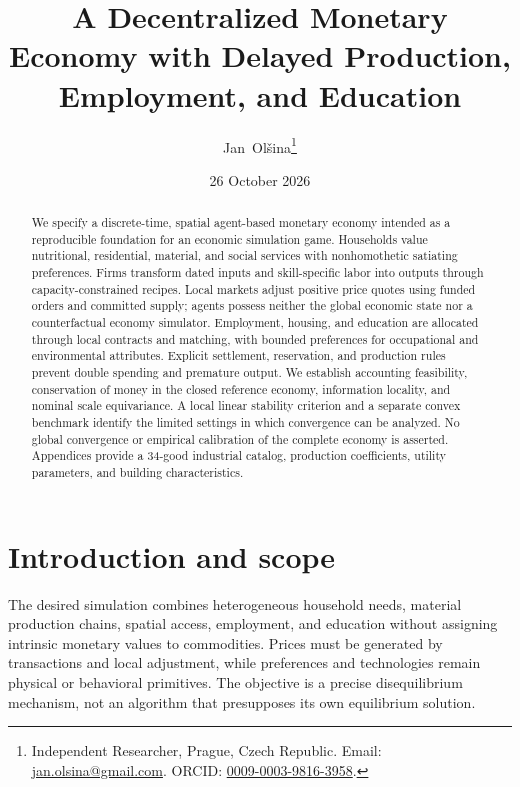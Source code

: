 \documentclass[10pt,a4paper,twocolumn]{article}
\begin{document}
\title{A Decentralized Monetary Economy with Delayed Production, Employment, and Education}
\author{Jan~Ol\v{s}ina\thanks{Independent Researcher, Prague, Czech Republic.
Email: \href{mailto:jan.olsina@gmail.com}{jan.olsina@gmail.com}.
ORCID: \href{https://orcid.org/0009-0003-9816-3958}{0009-0003-9816-3958}.}}
\date{26 October 2026}
\maketitle

\begin{abstract}
We specify a discrete-time, spatial agent-based monetary economy intended
as a reproducible foundation for an economic simulation game. Households
value nutritional, residential, material, and social services with
nonhomothetic satiating preferences. Firms transform dated inputs and
skill-specific labor into outputs through capacity-constrained recipes.
Local markets adjust positive price quotes using funded orders and
committed supply; agents possess neither the global economic state nor a
counterfactual economy simulator. Employment, housing, and education are
allocated through local contracts and matching, with bounded preferences
for occupational and environmental attributes. Explicit settlement,
reservation, and production rules prevent double spending and premature
output. We establish accounting feasibility, conservation of money in the
closed reference economy, information locality, and nominal scale
equivariance. A local linear stability criterion and a separate convex
benchmark identify the limited settings in which convergence can be
analyzed. No global convergence or empirical calibration of the complete
economy is asserted. Appendices provide a 34-good industrial catalog,
production coefficients, utility parameters, and building characteristics.
\end{abstract}

\section{Introduction and scope}
The desired simulation combines heterogeneous household needs, material
production chains, spatial access, employment, and education without
assigning intrinsic monetary values to commodities. Prices must be
generated by transactions and local adjustment, while preferences and
technologies remain physical or behavioral primitives. The objective is a
precise disequilibrium mechanism, not an algorithm that presupposes its
own equilibrium solution.
\end{document}
